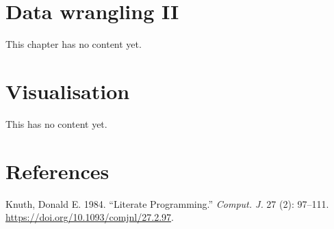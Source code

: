\documentclass[
  letterpaper,
  DIV=11,
  numbers=noendperiod]{scrreprt}
\newlength{\cslhangindent}
\newlength{\cslentryspacingunit} %
\newenvironment{CSLReferences}[2] %
 {%
  \setlength{\parindent}{0pt}
  \ifodd #1
  \let\oldpar\par
  \def\par{\hangindent=\cslhangindent\oldpar}
  \fi
  \setlength{\parskip}{#2\cslentryspacingunit}
 }%
 {}
\begin{document}

\hypertarget{data-wrangling-ii}{%
\chapter{Data wrangling II}\label{data-wrangling-ii}}

This chapter has no content yet.


\hypertarget{visualisation}{%
\chapter{Visualisation}\label{visualisation}}

This has no content yet.


\hypertarget{references}{%
\chapter*{References}\label{references}}


\hypertarget{refs}{}
\begin{CSLReferences}{1}{0}
\leavevmode{}%
Knuth, Donald E. 1984. {``Literate Programming.''} \emph{Comput. J.} 27
(2): 97--111. \url{https://doi.org/10.1093/comjnl/27.2.97}.

\end{CSLReferences}
\end{document}
